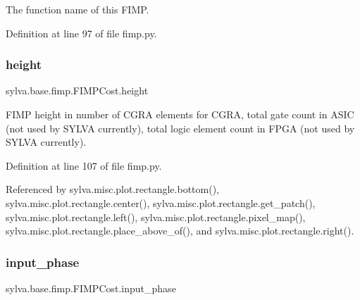 The function name of this F\+I\+MP. 



Definition at line 97 of file fimp.\+py.

\mbox{\label{classsylva_1_1base_1_1fimp_1_1_f_i_m_p_cost_a0e40cec2324c7d0eb82f511a0925c839}} 
\subsubsection{\texorpdfstring{height}{height}}
{\footnotesize\ttfamily sylva.\+base.\+fimp.\+F\+I\+M\+P\+Cost.\+height}



F\+I\+MP height in number of C\+G\+RA elements for C\+G\+RA, total gate count in A\+S\+IC (not used by S\+Y\+L\+VA currently), total logic element count in F\+P\+GA (not used by S\+Y\+L\+VA currently). 



Definition at line 107 of file fimp.\+py.



Referenced by sylva.\+misc.\+plot.\+rectangle.\+bottom(), sylva.\+misc.\+plot.\+rectangle.\+center(), sylva.\+misc.\+plot.\+rectangle.\+get\+\_\+patch(), sylva.\+misc.\+plot.\+rectangle.\+left(), sylva.\+misc.\+plot.\+rectangle.\+pixel\+\_\+map(), sylva.\+misc.\+plot.\+rectangle.\+place\+\_\+above\+\_\+of(), and sylva.\+misc.\+plot.\+rectangle.\+right().

\mbox{\label{classsylva_1_1base_1_1fimp_1_1_f_i_m_p_cost_a334924c4d82dc491fbc97c8ec09058ca}} 
\subsubsection{\texorpdfstring{input\+\_\+phase}{input\_phase}}
{\footnotesize\ttfamily sylva.\+base.\+fimp.\+F\+I\+M\+P\+Cost.\+input\+\_\+phase}



